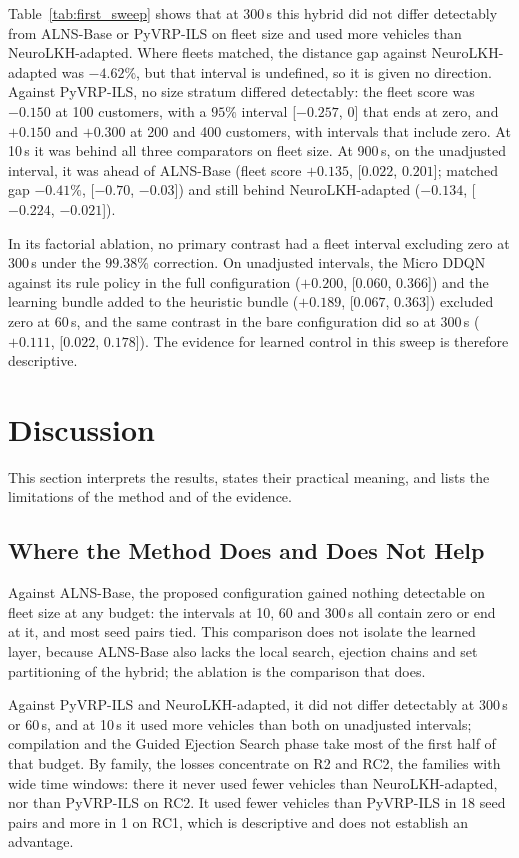 \documentclass{ieeeaccess}
\begin{document}
Table~\ref{tab:first_sweep} shows that at 300\,s this hybrid did not differ detectably from ALNS-Base or PyVRP-ILS on fleet size and used more vehicles than NeuroLKH-adapted. Where fleets matched, the distance gap against NeuroLKH-adapted was $-4.62\%$, but that interval is undefined, so it is given no direction. Against PyVRP-ILS, no size stratum differed detectably: the fleet score was $-0.150$ at 100 customers, with a $95\%$ interval [$-0.257$, $0$] that ends at zero, and $+0.150$ and $+0.300$ at 200 and 400 customers, with intervals that include zero. At 10\,s it was behind all three comparators on fleet size. At 900\,s, on the unadjusted interval, it was ahead of ALNS-Base (fleet score $+0.135$, [$0.022$, $0.201$]; matched gap $-0.41\%$, [$-0.70$, $-0.03$]) and still behind NeuroLKH-adapted ($-0.134$, [$-0.224$, $-0.021$]).

In its factorial ablation, no primary contrast had a fleet interval excluding zero at 300\,s under the $99.38\%$ correction. On unadjusted intervals, the Micro DDQN against its rule policy in the full configuration ($+0.200$, [$0.060$, $0.366$]) and the learning bundle added to the heuristic bundle ($+0.189$, [$0.067$, $0.363$]) excluded zero at 60\,s, and the same contrast in the bare configuration did so at 300\,s ($+0.111$, [$0.022$, $0.178$]). The evidence for learned control in this sweep is therefore descriptive.

\section{Discussion}
\label{sec:discussion}

This section interprets the results, states their practical meaning, and lists the limitations of the method and of the evidence.

\subsection{Where the Method Does and Does Not Help}
\label{sec:disc_scale_aware}
Against ALNS-Base, the proposed configuration gained nothing detectable on fleet size at any budget: the intervals at 10, 60 and 300\,s all contain zero or end at it, and most seed pairs tied. This comparison does not isolate the learned layer, because ALNS-Base also lacks the local search, ejection chains and set partitioning of the hybrid; the ablation is the comparison that does.

Against PyVRP-ILS and NeuroLKH-adapted, it did not differ detectably at 300\,s or 60\,s, and at 10\,s it used more vehicles than both on unadjusted intervals; compilation and the Guided Ejection Search phase take most of the first half of that budget. By family, the losses concentrate on R2 and RC2, the families with wide time windows: there it never used fewer vehicles than NeuroLKH-adapted, nor than PyVRP-ILS on RC2. It used fewer vehicles than PyVRP-ILS in 18 seed pairs and more in 1 on RC1, which is descriptive and does not establish an advantage.
\end{document}

